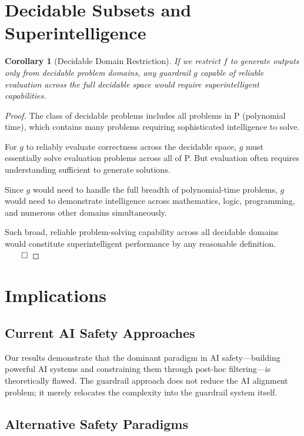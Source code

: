 \documentclass[11pt]{article}
\newtheorem{corollary}{Corollary}
\begin{document}
\section{Decidable Subsets and Superintelligence}

\begin{corollary}[Decidable Domain Restriction]
If we restrict $f$ to generate outputs only from decidable problem domains, any guardrail $g$ capable of reliable evaluation across the full decidable space would require superintelligent capabilities.
\end{corollary}

\begin{proof}
The class of decidable problems includes all problems in P (polynomial time), which contains many problems requiring sophisticated intelligence to solve.

For $g$ to reliably evaluate correctness across the decidable space, $g$ must essentially solve evaluation problems across all of P. But evaluation often requires understanding sufficient to generate solutions.

Since $g$ would need to handle the full breadth of polynomial-time problems, $g$ would need to demonstrate intelligence across mathematics, logic, programming, and numerous other domains simultaneously.

Such broad, reliable problem-solving capability across all decidable domains would constitute superintelligent performance by any reasonable definition. $\qed$
\end{proof}

\section{Implications}

\subsection{Current AI Safety Approaches}

Our results demonstrate that the dominant paradigm in AI safety—building powerful AI systems and constraining them through post-hoc filtering—is theoretically flawed. The guardrail approach does not reduce the AI alignment problem; it merely relocates the complexity into the guardrail system itself.

\subsection{Alternative Safety Paradigms}
\end{document}
